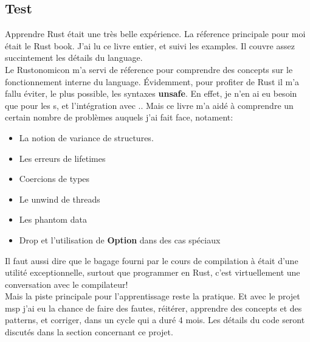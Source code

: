    \subsection{Test }
        Apprendre Rust était une très belle expérience. La réference principale
        pour moi était le Rust book\cite{rust_book}. J'ai lu ce livre entier,
        et suivi les examples. Il couvre assez succintement les détails du
        language.\\[0.3cm]
        Le Rustonomicon\cite{rust_unsafe_book} m'a servi de réference pour
        comprendre des concepts sur le fonctionnement interne du language.
        \'Evidemment, pour profiter de Rust il m'a fallu éviter, le plus possible,
        les syntaxes \textbf{unsafe}. En effet, je n'en ai eu besoin que pour les
        s, et l'intégration avec .. Mais ce livre m'a aidé à
        comprendre un certain nombre de problèmes auquels j'ai fait face, notament:
        \begin{itemize}
            \renewcommand{\labelitemi}{$\bullet$}
            \item La notion de variance de structures\cite{variance_wiki}.
            \item Les erreurs de lifetimes
            \item Coercions de types
            \item Le unwind de threads
            \item Les phantom data
            \item Drop et l'utilisation de \textbf{Option} dans des cas spéciaux
        \end{itemize}
        \bigskip
        Il faut aussi dire que le bagage fourni par le cours de compilation à
        \establishment{} était d'une utilité exceptionnelle, surtout que
        programmer en Rust, c'est virtuellement une conversation avec le
        compilateur!\\[0.3cm]
        Mais la piste principale pour l'apprentissage reste la pratique. Et avec
        le projet \gls{msp} j'ai eu la chance de faire des fautes, réitérer,
        apprendre des concepts et des patterns, et corriger, dans un cycle qui a
        duré 4 mois. Les détails du code seront discutés dans la section
        concernant ce projet.

